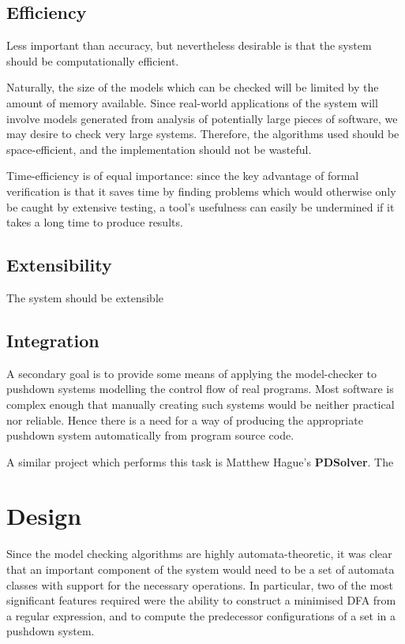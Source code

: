 \documentclass[11pt]{article}
\theoremstyle{definition}
\begin{document}
\subsection{Efficiency}

Less important than accuracy, but nevertheless desirable is that the system
should be computationally efficient. 

Naturally, the size of the models which can be checked will be limited by the
amount of memory available. Since real-world applications of the system will
involve models generated from analysis of potentially large pieces of software,
we may desire to check very large systems. Therefore, the algorithms used
should be space-efficient, and the implementation should not be wasteful.

Time-efficiency is of equal importance: since the key advantage of formal
verification is that it saves time by finding problems which would otherwise
only be caught by extensive testing, a tool's usefulness can easily be
undermined if it takes a long time to produce results.

\subsection{Extensibility}

The system should be extensible

\subsection{Integration}
A secondary goal is to provide some means of applying the model-checker to
pushdown systems modelling the control flow of real programs. Most software is
complex enough that manually creating such systems would be neither practical
nor reliable. Hence there is a need for a way of producing the appropriate
pushdown system automatically from program source code.

A similar project which performs this task is Matthew Hague's \textbf{PDSolver}.
The 

\section{Design}



Since the model checking algorithms are highly automata-theoretic, it was clear
that an important component of the system would need to be a set of automata classes
with support for the necessary operations. In particular, two of the most
significant features required were the ability to construct a minimised DFA from a
regular expression, and to compute the predecessor configurations of a set in a
pushdown system. %
\end{document}
